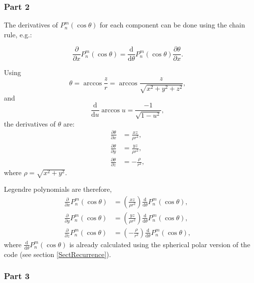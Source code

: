 \documentclass[]{article}
\begin{document}
		\subsubsection{Part 2}
			
			The derivatives of $P_n^m(\cos\theta)$ for each component can be done using the chain rule, e.g.:
			
			\begin{equation}
				\frac{\partial}{\partial x} P_n^m(\cos\theta) = \frac{\text{d}}{\text{d} \theta} P_n^m(\cos\theta) \frac{\partial \theta}{\partial x}.
			\end{equation}
			
			Using
			\begin{equation}
			\theta = \arccos\frac{z}{r} = \arccos{\frac{z}{\sqrt{x^2 + y^2 + z^2}}},
			\end{equation}
			and 
			\begin{equation}
				\frac{\text{d}}{\text{d} u} \arccos{u} = \frac{-1}{\sqrt{1 - u^2}}, 
			\end{equation}
			the derivatives of $\theta$ are:
			\begin{align}
				\frac{\partial \theta}{\partial x} &= \frac{xz}{\rho r^2}, \\
				\frac{\partial \theta}{\partial y} &= \frac{yz}{\rho r^2}, \\
				\frac{\partial \theta}{\partial z} &= -\frac{\rho}{r^2}, 
			\end{align}
			where $\rho = \sqrt{x^2 + y^2}$.
			
			Legendre polynomials are therefore,
			\begin{align}
				\frac{\partial}{\partial x} P_n^m(\cos\theta) &= \left(\frac{xz}{\rho r^2}\right)\frac{\text{d}}{\text{d} \theta} P_n^m(\cos\theta), \\
				\frac{\partial}{\partial y} P_n^m(\cos\theta) &= \left(\frac{yz}{\rho r^2}\right)\frac{\text{d}}{\text{d} \theta} P_n^m(\cos\theta), \\
				\frac{\partial}{\partial z} P_n^m(\cos\theta) &= \left(-\frac{\rho}{r^2}\right)\frac{\text{d}}{\text{d} \theta} P_n^m(\cos\theta), 
			\end{align}	
			where $\frac{\text{d}}{\text{d} \theta} P_n^m(\cos\theta)$ is already calculated using the spherical polar version of the code (see section \ref{SectRecurrence}).
		
		\subsubsection{Part 3}		
		
\end{document}
